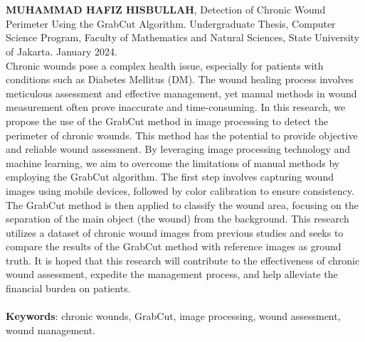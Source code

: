 \chapter*{}
\singlespacing{}

\textbf{MUHAMMAD HAFIZ HISBULLAH}, Detection of Chronic Wound Perimeter Using the 
GrabCut Algorithm. Undergraduate Thesis, Computer Science Program, Faculty of 
Mathematics and Natural Sciences, State University of Jakarta. January 2024.
\\

Chronic wounds pose a complex health issue, especially for patients with conditions 
such as Diabetes Mellitus (DM). The wound healing process involves meticulous 
assessment and effective management, yet manual methods in wound measurement often 
prove inaccurate and time-consuming. In this research, we propose the use of the 
GrabCut method in image processing to detect the perimeter of chronic wounds. 
This method has the potential to provide objective and reliable wound assessment.
By leveraging image processing technology and machine learning, we aim to overcome 
the limitations of manual methods by employing the GrabCut algorithm. The first 
step involves capturing wound images using mobile devices, followed by color 
calibration to ensure consistency. The GrabCut method is then applied to classify 
the wound area, focusing on the separation of the main object (the wound) from 
the background. This research utilizes a dataset of chronic wound images from 
previous studies and seeks to compare the results of the GrabCut method with 
reference images as ground truth. It is hoped that this research will contribute 
to the effectiveness of chronic wound assessment, expedite the management process, 
and help alleviate the financial burden on patients.
\\
\\
\textbf{Keywords}: chronic wounds, GrabCut, image processing, wound assessment, wound management.
